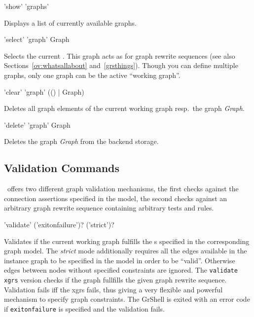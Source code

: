 \begin{rail}
  'show' 'graphs'
\end{rail}
Displays a list of currently available graphs.

\begin{rail}
  'select' 'graph' Graph
\end{rail}
Selects the current .
This graph acts as \emph{} for graph rewrite sequences (see also Sections~\ref{ov:whatsallabout} and~\ref{grsthings}).
Though you can define multiple graphs, only one graph can be the active ``working graph''.

\begin{rail}
  'clear' 'graph' (() | Graph)
\end{rail}
Deletes all graph elements of the current working graph resp.\ the graph \emph{Graph}.

\begin{rail}
  'delete' 'graph' Graph
\end{rail}
Deletes the graph \emph{Graph} from the backend storage.


\subsection{Validation Commands}

\GrG\ offers two different graph validation mechanisms, the first checks against the connection assertions specified in the model, the second checks against an arbitrary graph rewrite sequence containing arbitrary tests and rules.

\begin{rail}
  'validate' ('exitonfailure')? ('strict')?
\end{rail}
Validates if the current working graph fulfills the s specified in the corresponding graph model.
The \emph{strict} mode additionally requires all the edges available in the instance graph to be specified in the model in order to be ``valid''.
Otherwise edges between nodes without specified constraints are ignored.
The \texttt{validate xgrs} version checks if the graph fullfills the given graph rewrite sequence.
Validation fails iff the xgrs fails, thus giving a very flexible and powerful mechanism to specify graph constraints.
The GrShell is exited with an error code if \texttt{exitonfailure} is specified and the validation fails.

